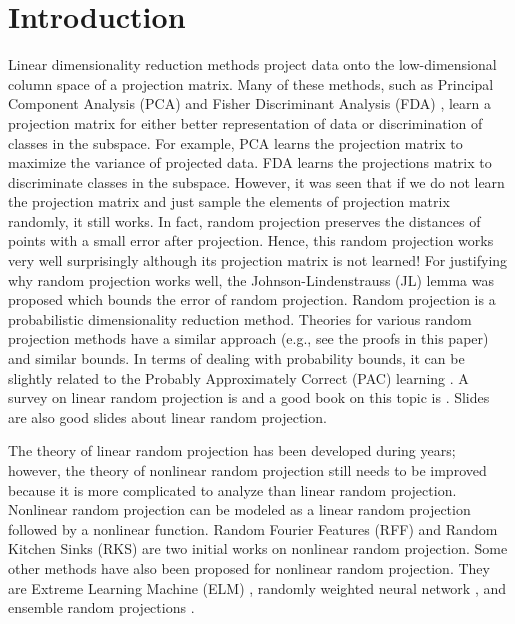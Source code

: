 \documentclass{article}
\begin{document}
\section{Introduction}

Linear dimensionality reduction methods project data onto the low-dimensional column space of a projection matrix.
Many of these methods, such as Principal Component Analysis (PCA) \cite{ghojogh2019unsupervised} and Fisher Discriminant Analysis (FDA) \cite{ghojogh2019fisher}, learn a projection matrix for either better representation of data or discrimination of classes in the subspace. 
For example, PCA learns the projection matrix to maximize the variance of projected data. FDA learns the projections matrix to discriminate classes in the subspace. 
However, it was seen that if we do not learn the projection matrix and just sample the elements of projection matrix randomly, it still works. 
In fact, random projection preserves the distances of points with a small error after projection. 
Hence, this random projection works very well surprisingly although its projection matrix is not learned! 
For justifying why random projection works well, the Johnson-Lindenstrauss (JL) lemma \cite{johnson1984extensions} was proposed which bounds the error of random projection. 
Random projection is a probabilistic dimensionality reduction method. 
Theories for various random projection methods have a similar approach (e.g., see the proofs in this paper) and similar bounds. 
In terms of dealing with probability bounds, it can be slightly related to the Probably Approximately Correct (PAC) learning \cite{shalev2014understanding}. 
A survey on linear random projection is \cite{xie2017survey} and a good book on this topic is \cite{vempala2005random}. Slides \cite{liberty2006random,ward2014dimension} are also good slides about linear random projection. 

The theory of linear random projection has been developed during years; however, the theory of nonlinear random projection still needs to be improved because it is more complicated to analyze than linear random projection. 
Nonlinear random projection can be modeled as a linear random projection followed by a nonlinear function. 
Random Fourier Features (RFF) \cite{rahimi2007random} and Random Kitchen Sinks (RKS) \cite{rahimi2008weighted,rahimi2008uniform} are two initial works on nonlinear random projection. Some other methods have also been proposed for nonlinear random projection. They are Extreme Learning Machine (ELM) \cite{huang2006extreme,huang2011extreme,tang2015extreme}, randomly weighted neural network \cite{jarrett2009best}, and ensemble random projections \cite{schclar2009random,cannings2015random,karimi2017ensembles}. 
\end{document}
